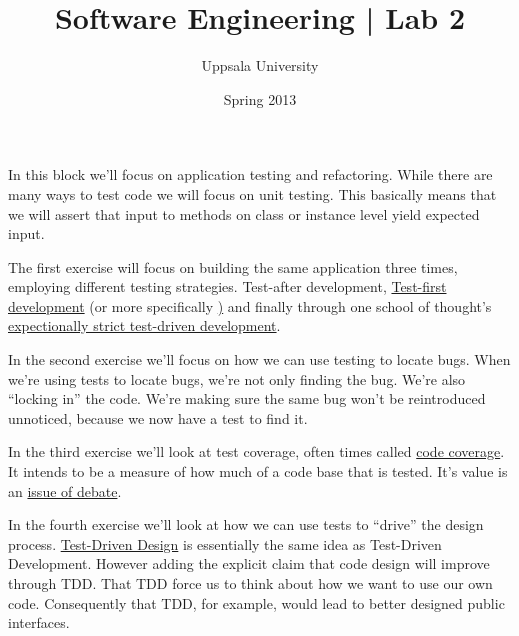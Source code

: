 \documentclass{article}
\begin{document}
  \title{ Software Engineering | Lab 2 }
  \author{ Uppsala University }
  \date{ Spring 2013 }
  \maketitle



    \paragraph{}
      In this block we'll focus on application testing and refactoring. While there are many ways to test code we will focus on unit testing. This basically means that we will assert that input to methods on class or instance level yield expected input.

      The first exercise will focus on building the same application three times, employing different testing strategies. Test-after development, \href{http://www.extremeprogramming.org/rules/testfirst.html}{Test-first development} (or more specifically \href{Test-driven development}) and finally through one school of thought's \href{http://stackoverflow.com/questions/7690238/test-driven-development-initial-implementation}{expectionally strict test-driven development}.

      In the second exercise we'll focus on how we can use testing to locate bugs. When we're using tests to locate bugs, we're not only finding the bug. We're also ``locking in'' the code. We're making sure the same bug won't be reintroduced unnoticed, because we now have a test to find it.

      In the third exercise we'll look at test coverage, often times called \href{http://en.wikipedia.org/wiki/Code_coverage}{code coverage}. It intends to be a measure of how much of a code base that is tested. It's value is an \href{http://martinfowler.com/bliki/TestCoverage.html}{issue of debate}.

      In the fourth exercise we'll look at how we can use tests to ``drive'' the design process. \href{http://stackoverflow.com/questions/7538744/is-test-driven-development-the-same-as-test-driven-design}{Test-Driven Design} is essentially the same idea as Test-Driven Development. However adding the explicit claim that code design will improve through TDD. That TDD force us to think about how we want to use our own code.  Consequently that TDD, for example, would lead to better designed public interfaces.
\end{document}
